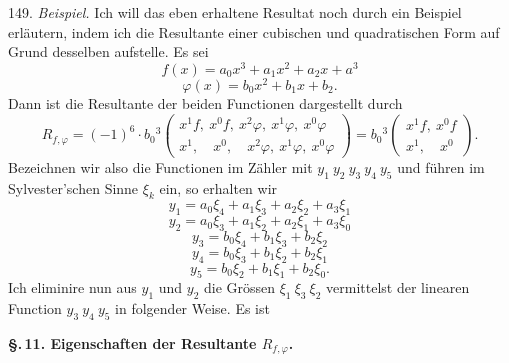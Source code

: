 149. \textit{Beispiel.} Ich will das eben erhaltene Resultat noch
durch ein Beispiel erl\"autern, indem ich die Resultante einer
cubischen und quadratischen Form auf Grund desselben aufstelle. Es sei
\[
f(x) = a_0x^3 + a_1x^2 + a_2x + a^3
\]
\[
\varphi(x) = b_0x^2 + b_1x + b_2.
\]
Dann ist die Resultante der beiden Functionen dargestellt durch
\[
R_{f,\varphi} = (-1)^6\cdot b_0{}^3\left(\begin{array}{l}
x^1f,\ x^0f,\ x^2\varphi,\ x^1\varphi,\ x^0\varphi\\[2pt]
x^1,\quad x^0,\quad x^2\varphi,\ x^1\varphi,\ x^0\varphi
\end{array}\right)
= b_0{}^3\left(\begin{array}{l}
x^1f,\ x^0f\\[2pt]
x^1,\quad x^0
\end{array}\right).
\]
Bezeichnen wir also die Functionen im Z\"ahler mit
$y_1\ y_2\ y_3\ y_4\ y_5$ und f\"uhren im Sylvester'schen Sinne $\xi_k$
ein, so erhalten wir
\[
y_1 = a_0\xi_4 + a_1\xi_3 + a_2\xi_2 + a_3\xi_1
\]
\[
y_2 = a_0\xi_3 + a_1\xi_2 + a_2\xi_1 + a_3\xi_0
\]
\[
y_3 = b_0\xi_4 + b_1\xi_3 + b_2\xi_2
\]
\[
y_4 = b_0\xi_3 + b_1\xi_2 + b_2\xi_1
\]
\[
y_5 = b_0\xi_2 + b_1\xi_1 + b_2\xi_0.
\]
Ich eliminire nun aus $y_1$ und $y_2$ die Gr\"ossen $\xi_1\ \xi_3\ \xi_2$
vermittelst der linearen Function $y_3\ y_4\ y_5$ in folgender Weise.
Es ist


\textbf{\S.\,11. Eigenschaften der Resultante $R_{f,\varphi}$.}

